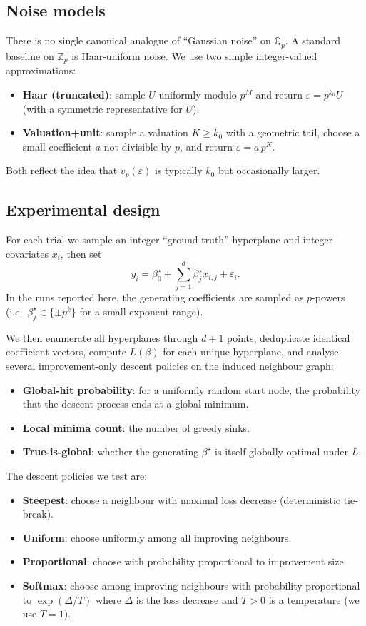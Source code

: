 \documentclass[11pt]{article}
\begin{document}
\subsection{Noise models}
There is no single canonical analogue of ``Gaussian noise'' on $\mathbb{Q}_p$. A standard baseline on $\mathbb{Z}_p$ is Haar-uniform noise. We use two simple integer-valued approximations:
\begin{itemize}
  \item \textbf{Haar (truncated)}: sample $U$ uniformly modulo $p^M$ and return $\varepsilon = p^{k_0}U$ (with a symmetric representative for $U$).
  \item \textbf{Valuation+unit}: sample a valuation $K\ge k_0$ with a geometric tail, choose a small coefficient $a$ not divisible by $p$, and return $\varepsilon = a\,p^K$.
\end{itemize}
Both reflect the idea that $v_p(\varepsilon)$ is typically $k_0$ but occasionally larger.

\subsection{Experimental design}
For each trial we sample an integer ``ground-truth'' hyperplane and integer covariates $x_i$, then set
\[
y_i = \beta_0^\star + \sum_{j=1}^d \beta_j^\star x_{i,j} + \varepsilon_i.
\]
In the runs reported here, the generating coefficients are sampled as $p$-powers (i.e.\ $\beta_j^\star \in \{\pm p^k\}$ for a small exponent range).

We then enumerate all hyperplanes through $d{+}1$ points, deduplicate identical coefficient vectors, compute $L(\beta)$ for each unique hyperplane, and analyse several improvement-only descent policies on the induced neighbour graph:
\begin{itemize}
  \item \textbf{Global-hit probability}: for a uniformly random start node, the probability that the descent process ends at a global minimum.
  \item \textbf{Local minima count}: the number of greedy sinks.
  \item \textbf{True-is-global}: whether the generating $\beta^\star$ is itself globally optimal under $L$.
\end{itemize}

The descent policies we test are:
\begin{itemize}
  \item \textbf{Steepest}: choose a neighbour with maximal loss decrease (deterministic tie-break).
  \item \textbf{Uniform}: choose uniformly among all improving neighbours.
  \item \textbf{Proportional}: choose with probability proportional to improvement size.
  \item \textbf{Softmax}: choose among improving neighbours with probability proportional to $\exp(\Delta/T)$ where $\Delta$ is the loss decrease and $T>0$ is a temperature (we use $T=1$).
\end{itemize}
\end{document}
